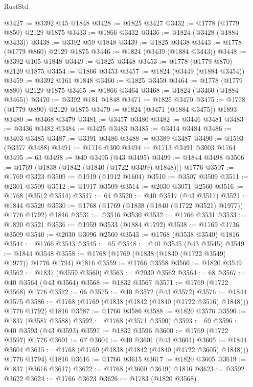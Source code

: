 \begin{lexlean}{RustStd}
\begin{coremodule}
@3427 := @3392 @45 @1848
@3428 := @1825 @3427
@3432 := @1778 (@1779 @850) @2129 @1875
@3433 := @1866 @3432
@3436 := @1824 (@3428 (@1884 @3433))
@3438 := @3392 @59 @1848
@3439 := @1825 @3438
@3443 := @1778 (@1779 @860) @2129 @1875
@3446 := @1824 (@3439 (@1884 @3443))
@3448 := @3392 @105 @1848
@3449 := @1825 @3448
@3453 := @1778 (@1779 @870) @2129 @1875
@3454 := @1866 @3453
@3457 := @1824 (@3449 (@1884 @3454))
@3459 := @3392 @161 @1848
@3460 := @1825 @3459
@3464 := @1778 (@1779 @880) @2129 @1875
@3465 := @1866 @3464
@3468 := @1824 (@3460 (@1884 @3465))
@3470 := @3392 @181 @1848
@3471 := @1825 @3470
@3475 := @1778 (@1779 @890) @2129 @1875
@3479 := @1824 (@3471 (@1884 @3475)) @1893
@3480 := @3468 @3479
@3481 := @3457 @3480
@3482 := @3446 @3481
@3483 := @3436 @3482
@3484 := @3425 @3483
@3485 := @3414 @3484
@3486 := @3403 @3485
@3487 := @3391 @3486
@3488 := @3389 @3487
@3490 := @1593 (@3377 @3488)
@3491 := @1716 @300
@3494 := @1713 @3491 @3003 @1764
@3495 := 63
@3498 := @40 @3495 (@43 @3495)
@3499 := @1844 @3498
@3506 := @1769 (@1838 (@1842 (@1840 (@1722 @3499) @1848))) @1776
@3507 := @1769 @3323
@3509 := @1919 (@1912 @1604)
@3510 := @3507 @3509
@3511 := @2301 @3509
@3512 := @1917 @3509
@3514 := @2030 @3071 @2560
@3516 := @1768 (@3512 @3514)
@3517 := 64
@3520 := @40 @3517 (@43 @3517)
@3521 := @1844 @3520
@3530 := @1768 (@1769 (@1838 (@1840 (@1722 @3521) @1977)) @1776 @1792) @1816
@3531 := @3516 @3530
@3532 := @1766 @3531
@3533 := @1820 @3521
@3536 := @1959 @3533 (@1884 @1792)
@3538 := @1769 @1736 @3509
@3540 := @2030 @3096 @2560
@3543 := @1768 (@3538 @3540) @1816
@3544 := @1766 @3543
@3545 := 65
@3548 := @40 @3545 (@43 @3545)
@3549 := @1844 @3548
@3558 := @1768 (@1769 (@1838 (@1840 (@1722 @3549) @1977)) @1776 @1794) @1816
@3559 := @1766 @3558
@3560 := @1820 @3549
@3562 := @1837 (@3559 @3560)
@3563 := @2030 @3562
@3564 := 68
@3567 := @40 @3564 (@43 @3564)
@3568 := @1832 @3567
@3571 := @1769 (@1722 @3568) @1776
@3572 := 66
@3575 := @40 @3572 (@43 @3572)
@3576 := @1844 @3575
@3586 := @1768 (@1769 (@1838 (@1842 (@1840 (@1722 @3576) @1848))) @1776 @1792) @1816
@3587 := @1766 @3586
@3588 := @1820 @3576
@3590 := @1837 (@3587 @3588)
@3592 := @1768 (@3571 @3590)
@3593 := 69
@3596 := @40 @3593 (@43 @3593)
@3597 := @1832 @3596
@3600 := @1769 (@1722 @3597) @1776
@3601 := 67
@3604 := @40 @3601 (@43 @3601)
@3605 := @1844 @3604
@3615 := @1768 (@1769 (@1838 (@1842 (@1840 (@1722 @3605) @1848))) @1776 @1794) @1816
@3616 := @1766 @3615
@3617 := @1820 @3605
@3619 := @1837 (@3616 @3617)
@3622 := @1768 (@3600 @3619) @1816
@3623 := @3592 @3622
@3624 := @1766 @3623
@3626 := @1783 (@1820 @3568)

\end{coremodule}
\end{lexlean}
